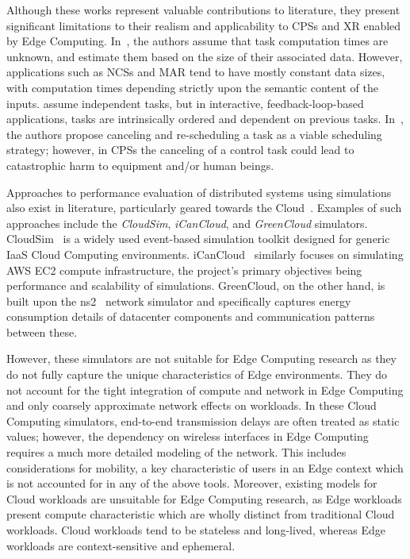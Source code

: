 Although these works represent valuable contributions to literature, they present significant limitations to their realism and applicability to \glspl{CPS} and \gls{XR} enabled by Edge Computing.
In~\cite{chen2015efficient,champati2016semi}, the authors assume that task computation times are unknown, and estimate them based on the size of their associated data.
However, applications such as \glspl{NCS} and \gls{MAR} tend to have mostly constant data sizes, with computation times depending strictly upon the semantic content of the inputs.\@
\cite{champati2016semi,al2017reliable} assume independent tasks, but in interactive, feedback-loop-based applications, tasks are intrinsically ordered and dependent on previous tasks.
In~\cite{champati2015one}, the authors propose canceling and re-scheduling a task as a viable scheduling strategy; however, in \glspl{CPS} the canceling of a control task could lead to catastrophic harm to equipment and/or human beings.

Approaches to performance evaluation of distributed systems using simulations also exist in literature, particularly geared towards the Cloud~\cite{mansouri2020cloud}.
Examples of such approaches include the \emph{CloudSim}, \emph{iCanCloud}, and \emph{GreenCloud} simulators.
CloudSim~\cite{calheiros2011cloudsim} is a widely used event-based simulation toolkit designed for generic \gls{IaaS} Cloud Computing environments.
iCanCloud~\cite{nunez2012icancloud} similarly focuses on simulating \gls{AWS} \gls{EC2} compute infrastructure, the project's primary objectives being performance and scalability of simulations.
GreenCloud, on the other hand, is built upon the \acs{ns2}~\cite{nsnam} network simulator and specifically captures energy consumption details of datacenter components and communication patterns between these.

However, these simulators are not suitable for Edge Computing research as they do not fully capture the unique characteristics of Edge environments.
They do not account for the tight integration of compute and network in Edge Computing and only coarsely approximate network effects on workloads.
In these Cloud Computing simulators, end-to-end transmission delays are often treated as static values;
however, the dependency on wireless interfaces in Edge Computing requires a much more detailed modeling of the network.
This includes considerations for mobility, a key characteristic of users in an Edge context which is not accounted for in any of the above tools.
Moreover, existing models for Cloud workloads are unsuitable for Edge Computing research, as Edge workloads present compute characteristic which are wholly distinct from traditional Cloud workloads.
Cloud workloads tend to be stateless and long-lived, whereas Edge workloads are context-sensitive and ephemeral.

